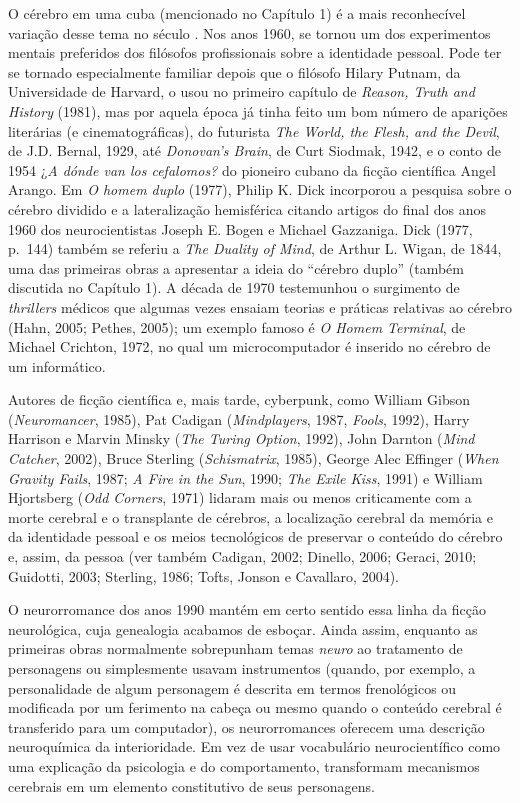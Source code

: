 O cérebro em uma cuba (mencionado no Capítulo 1) é a mais reconhecível
variação desse tema no século . Nos anos 1960, se tornou um dos
experimentos mentais preferidos dos filósofos profissionais sobre a
identidade pessoal. Pode ter se tornado especialmente familiar depois
que o filósofo Hilary Putnam, da Universidade de Harvard, o usou no primeiro capítulo de
\emph{Reason, Truth and History} (1981), mas por aquela época já tinha
feito um bom número de aparições literárias (e cinematográficas), do
futurista \emph{The World, the Flesh, and the Devil}, de J.D. Bernal,
1929, até \emph{Donovan's Brain}, de Curt Siodmak, 1942, e o conto de
1954 ¿\emph{A dónde van los cefalomos?} do pioneiro cubano da ficção
científica Angel Arango. Em \emph{O homem duplo} (1977), Philip K. Dick
incorporou a pesquisa sobre o cérebro dividido e a lateralização
hemisférica citando artigos do final dos anos 1960 dos neurocientistas
Joseph E. Bogen e Michael Gazzaniga. Dick (1977, p.~144) também se
referiu a \emph{The Duality of Mind}, de Arthur L. Wigan, de 1844, uma
das primeiras obras a apresentar a ideia do ``cérebro duplo'' (também
discutida no Capítulo 1). A década de 1970 testemunhou o surgimento de
\emph{thrillers} médicos que algumas vezes ensaiam teorias e práticas
relativas ao cérebro (Hahn, 2005; Pethes, 2005); um exemplo famoso é
\emph{O Homem Terminal}, de Michael Crichton, 1972, no qual um
microcomputador é inserido no cérebro de um informático.

Autores de ficção científica e, mais tarde, cyberpunk, como William
Gibson (\emph{Neuromancer}, 1985), Pat Cadigan (\emph{Mindplayers},
1987, \emph{Fools}, 1992), Harry Harrison e Marvin Minsky (\emph{The
Turing Option}, 1992), John Darnton (\emph{Mind Catcher}, 2002), Bruce
Sterling (\emph{Schismatrix}, 1985), George Alec Effinger (\emph{When
Gravity Fails}, 1987; \emph{A Fire in the Sun}, 1990; \emph{The Exile
Kiss}, 1991) e William Hjortsberg (\emph{Odd Corners}, 1971) lidaram
mais ou menos criticamente com a morte cerebral e o transplante de
cérebros, a localização cerebral da memória e da identidade pessoal e os
meios tecnológicos de preservar o conteúdo do cérebro e, assim, da
pessoa (ver também Cadigan, 2002; Dinello, 2006; Geraci, 2010; Guidotti,
2003; Sterling, 1986; Tofts, Jonson e Cavallaro, 2004).

O neurorromance dos anos 1990 mantém em certo sentido essa linha da
ficção neurológica, cuja genealogia acabamos de esboçar. Ainda assim,
enquanto as primeiras obras normalmente sobrepunham temas \emph{neuro}
ao tratamento de personagens ou simplesmente usavam instrumentos
(quando, por exemplo, a personalidade de algum personagem é descrita em
termos frenológicos ou modificada por um ferimento na cabeça ou mesmo
quando o conteúdo cerebral é transferido para um computador), os
neurorromances oferecem uma descrição neuroquímica da interioridade. Em
vez de usar vocabulário neurocientífico como uma explicação da
psicologia e do comportamento, transformam mecanismos cerebrais em um
elemento constitutivo de seus personagens.

